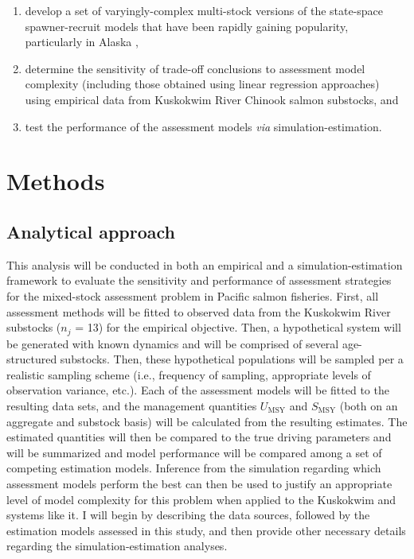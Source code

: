 \documentclass[12pt,]{book}
\theoremstyle{definition}
\theoremstyle{definition}
\theoremstyle{definition}
\theoremstyle{remark}
\begin{document}
\begin{enumerate}
\def\labelenumi{(\arabic{enumi})}
\item
  develop a set of varyingly-complex multi-stock versions of the
  state-space spawner-recruit models that have been rapidly gaining
  popularity, particularly in Alaska
  \citep{walters-martell-2004, su-peterman-2012, fleischman-etal-2013, staton-etal-2017-intseq},
\item
  determine the sensitivity of trade-off conclusions to assessment model
  complexity (including those obtained using linear regression
  approaches) using empirical data from Kuskokwim River Chinook salmon
  substocks, and
\item
  test the performance of the assessment models \emph{via}
  simulation-estimation.
\end{enumerate}

\section{Methods}\label{methods}

\subsection{Analytical approach}\label{analytical-approach}

This analysis will be conducted in both an empirical and a
simulation-estimation framework to evaluate the sensitivity and
performance of assessment strategies for the mixed-stock assessment
problem in Pacific salmon fisheries. First, all assessment methods will
be fitted to observed data from the Kuskokwim River substocks (\(n_j\) =
13) for the empirical objective. Then, a hypothetical system will be
generated with known dynamics and will be comprised of several
age-structured substocks. Then, these hypothetical populations will be
sampled per a realistic sampling scheme (i.e., frequency of sampling,
appropriate levels of observation variance, etc.). Each of the
assessment models will be fitted to the resulting data sets, and the
management quantities \(U_{\text{MSY}}\) and \(S_{\text{MSY}}\) (both on
an aggregate and substock basis) will be calculated from the resulting
estimates. The estimated quantities will then be compared to the true
driving parameters and will be summarized and model performance will be
compared among a set of competing estimation models. Inference from the
simulation regarding which assessment models perform the best can then
be used to justify an appropriate level of model complexity for this
problem when applied to the Kuskokwim and systems like it. I will begin
by describing the data sources, followed by the estimation models
assessed in this study, and then provide other necessary details
regarding the simulation-estimation analyses.
\end{document}
